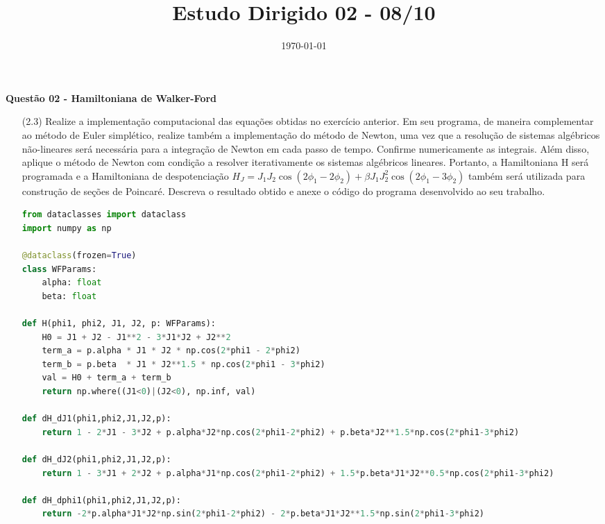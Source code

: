 \documentclass[a4paper]{article}
\date{\today}
\title{Estudo Dirigido 02 - 08/10}
\begin{document}
    \header{}

\textbf{Questão 02 - Hamiltoniana de Walker-Ford}
\begin{center}
\begin{itemize}

    \item[(2.3)] Realize a implementação computacional das equações obtidas no exercício anterior. Em seu programa, de maneira complementar ao método de Euler simplético, realize também a implementação do método de Newton, uma vez que a resolução de sistemas algébricos não-lineares será necessária para a integração de Newton em cada passo de tempo. Confirme numericamente as integrais. Além disso, aplique o método de Newton com condição a resolver iterativamente os sistemas algébricos lineares. Portanto, a Hamiltoniana H será programada e a Hamiltoniana de despotenciação \( H_J = J_1 J_2 \cos (2 \phi_1 - 2 \phi_2) + \beta J_1 J_2^2 \cos (2 \phi_1 - 3 \phi_2) \) também será utilizada para construção de seções de Poincaré. Descreva o resultado obtido e anexe o código do programa desenvolvido ao seu trabalho.
\begin{lstlisting}[language=Python, caption={Hamiltonianas do sistema e derivadas}, label={lst:hamiltoniana_derivadas}]
from dataclasses import dataclass
import numpy as np

@dataclass(frozen=True)
class WFParams:
    alpha: float
    beta: float

def H(phi1, phi2, J1, J2, p: WFParams):
    H0 = J1 + J2 - J1**2 - 3*J1*J2 + J2**2
    term_a = p.alpha * J1 * J2 * np.cos(2*phi1 - 2*phi2)
    term_b = p.beta  * J1 * J2**1.5 * np.cos(2*phi1 - 3*phi2)
    val = H0 + term_a + term_b
    return np.where((J1<0)|(J2<0), np.inf, val)

def dH_dJ1(phi1,phi2,J1,J2,p):
    return 1 - 2*J1 - 3*J2 + p.alpha*J2*np.cos(2*phi1-2*phi2) + p.beta*J2**1.5*np.cos(2*phi1-3*phi2)

def dH_dJ2(phi1,phi2,J1,J2,p):
    return 1 - 3*J1 + 2*J2 + p.alpha*J1*np.cos(2*phi1-2*phi2) + 1.5*p.beta*J1*J2**0.5*np.cos(2*phi1-3*phi2)

def dH_dphi1(phi1,phi2,J1,J2,p):
    return -2*p.alpha*J1*J2*np.sin(2*phi1-2*phi2) - 2*p.beta*J1*J2**1.5*np.sin(2*phi1-3*phi2)


\end{lstlisting}
\end{itemize}
\end{center}
\end{document}
